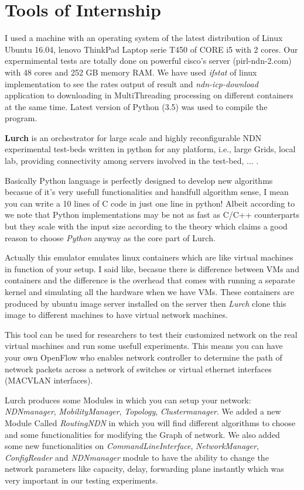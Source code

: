 \section{Tools of Internship}

I used a machine with an operating system of the latest distribution of Linux Ubuntu 16.04, lenovo ThinkPad Laptop serie T450 of CORE i5 with 2 cores. Our expermimental tests are totally done on powerful cisco's server (pirl-ndn-2.com) with 48 cores and 252 GB memory RAM. We have used \textit{ifstat} of linux implementation to see the rates output of result and \textit{ndn-icp-download} application to downloading in MultiThreading processing on different containers at the same time. Latest version of Python (3.5) was used to compile the program.

\textbf{\Huge{Lurch}} is an orchestrator for large scale and highly reconfigurable NDN experimental test-beds written in python for any platform, i.e., large Grids, local lab, providing connectivity among servers involved in the test-bed, ... .

Basically Python language is perfectly designed to develop new algorithms becasue of it's very usefull functionalities and handfull algorithm sense, I mean you can write a 10 lines of C code in just one line in python! Albeit according to \cite{python} we note that Python implementations may be not as fast as C/C++ counterparts but they scale with the input size according to the theory which claims a good reason to choose \textit{Python} anyway as the core part of Lurch.

Actually this emulator emulates linux containers which are like virtual machines in function of your setup. I said like, becasue there is difference between VMs and containers and the difference is the overhead that comes with running a separate kernel and simulating all the hardware when we have VMs. These containers are produced by ubuntu image server installed on the server then \textit{Lurch} clone this image to different machines to have virtual network machines. 

This tool can be used for researchers to test their customized network on the real virtual machines and run some usefull experiments. This means you can have your own OpenFlow who enables network controller to determine the path of network packets across a network of switches or virtual ethernet interfaces (MACVLAN interfaces).

Lurch produces some Modules in which you can setup your network: \textit{NDNmanager}, \textit{MobilityManager}, \textit{Topology}, \textit{Clustermanager}. We added a new Module Called \textit{RoutingNDN} in which you will find different algorithms to choose and some functionalities for modifying the Graph of network.
We also added some new functionalities on \textit{CommandLineInterface}, \textit{NetworkManager}, \textit{ConfigReader} and \textit{NDNmanager} module to have the ability to change the network parameters like capacity, delay, forwarding plane instantly which was very important in our testing experiments.

